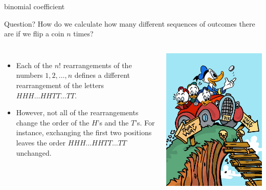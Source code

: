 \documentclass{beamer}
\begin{document}
\begin{frame}{binomial coefficient}
\begin{mybluebox}{Question?}
How do we calculate how many different sequences of outcomes there are if we flip a coin $n$ times?
\end{mybluebox}
\begin{columns}
\begin{itemize}
\item  Each of the $n!$ rearrangements of the
numbers $1,2,\ldots,n$ defines a different rearrangement of the
letters $HHH\ldots HHTT\ldots TT$.
\item However, not all of the
rearrangements change the order of the $H$'s and the $T$'s. For
instance, exchanging the first two positions leaves the order
$HHH\ldots HHTT\ldots TT$ unchanged.
\end{itemize}

\begin{center}
\includegraphics[width=1\textwidth]{img/donald.png}
\end{center}
\end{columns}

\end{frame}
\end{document}
